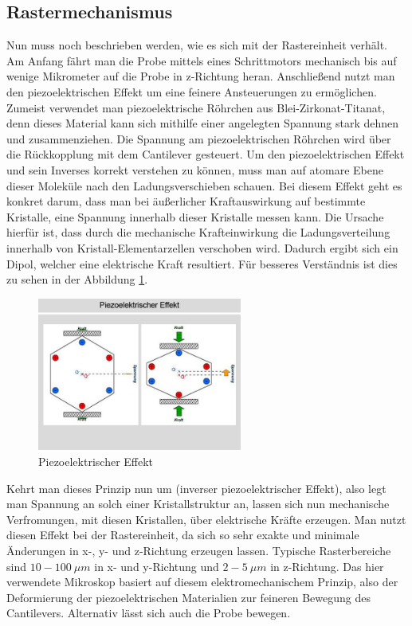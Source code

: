 \subsection{Rastermechanismus}

Nun muss noch beschrieben werden, wie es sich mit der Rastereinheit verhält.
Am Anfang fährt man die Probe mittels eines Schrittmotors mechanisch bis auf wenige Mikrometer auf die Probe in z-Richtung heran.
Anschließend nutzt man den piezoelektrischen Effekt um eine feinere Ansteuerungen zu ermöglichen.
Zumeist verwendet man piezoelektrische Röhrchen aus Blei-Zirkonat-Titanat, denn dieses Material kann sich mithilfe einer angelegten Spannung stark dehnen und zusammenziehen. 
Die Spannung am piezoelektrischen Röhrchen wird über die Rückkopplung mit dem Cantilever gesteuert. 
Um den piezoelektrischen Effekt und sein Inverses korrekt verstehen zu können, muss man auf atomare Ebene dieser Moleküle nach den Ladungsverschieben schauen.
Bei diesem Effekt geht es konkret darum, dass man bei äußerlicher Kraftauswirkung auf bestimmte Kristalle, eine Spannung innerhalb dieser Kristalle messen kann.
Die Ursache hierfür ist, dass durch die mechanische Krafteinwirkung die Ladungsverteilung innerhalb von Kristall-Elementarzellen verschoben wird.
Dadurch ergibt sich ein Dipol, welcher eine elektrische Kraft resultiert.
Für besseres Verständnis ist dies zu sehen in der Abbildung \ref{piezo}.

\begin{figure}[h!]
    \centering
    \includegraphics[width=0.6\textwidth]{Abb/piezo.jpg}
    \caption{Piezoelektrischer Effekt}
    \label{piezo}
\end{figure}

Kehrt man dieses Prinzip nun um (inverser piezoelektrischer Effekt), also legt man Spannung an solch einer Kristallstruktur an, lassen sich nun mechanische Verfromungen, mit diesen Kristallen, über elektrische Kräfte erzeugen.
Man nutzt diesen Effekt bei der Rastereinheit, da sich so sehr exakte und minimale Änderungen in x-, y- und z-Richtung erzeugen lassen.
Typische Rasterbereiche sind $10-\SI{100}{\mu m}$ in x- und y-Richtung und $2-\SI{5}{\mu m}$ in z-Richtung.
Das hier verwendete Mikroskop basiert auf diesem elektromechanischem Prinzip, also der Deformierung der piezoelektrischen Materialien zur feineren Bewegung des Cantilevers.
Alternativ lässt sich auch die Probe bewegen.


